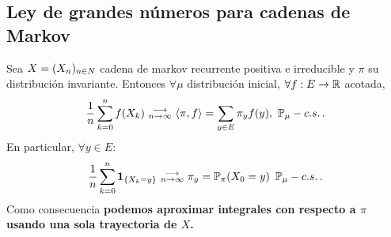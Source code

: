 \subsection{Ley de grandes números para cadenas de Markov}
\begin{theorem}
\label{lgn_cm}
Sea $X=(X_n)_{n\in N}$ cadena de markov recurrente positiva e irreducible y $\pi$ su distribución invariante. Entonces $\forall\mu$ distribución inicial, $\forall f:E\to\mathbb{R}$ acotada,
$$ \displaystyle\frac{1}{n}\sum^n_{k=0}f(X_k)\mbox{ }\substack{\longrightarrow \\ n\to\infty}\mbox{ }\langle\pi,f\rangle=\sum_{y\in E}\pi_y f(y), \mbox{ }\mathbb{P}_\mu-c.s. \, .$$
En particular, $\forall y\in E$:
$$ \displaystyle\frac{1}{n}\sum^n_{k=0}\mathbf{1}_{\{X_k=y\}}\mbox{ }\substack{\longrightarrow \\ n\to\infty}\mbox{ }\pi_y=\mathbb{P}_\pi(X_0=y) \, \mbox{ }\mathbb{P}_\mu-c.s. \,  .$$
Como consecuencia \textbf{podemos aproximar integrales con respecto a $\pi$ usando una sola trayectoria de $X$.} 
\end{theorem}
